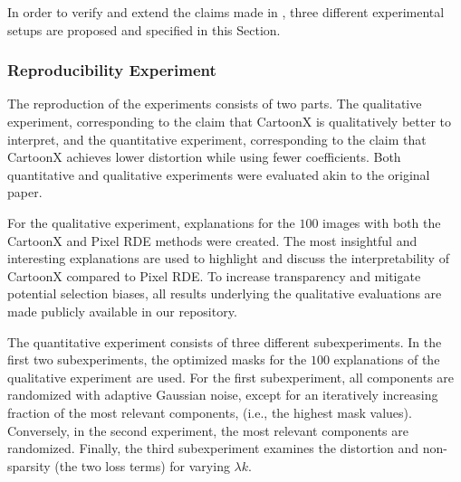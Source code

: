 In order to verify and extend the claims made in \cite{cartoonX}, three different experimental setups are proposed and specified in this Section.  


\subsubsection{Reproducibility Experiment}\label{exp1}

The reproduction of the experiments consists of two parts. The qualitative experiment, corresponding to the claim that CartoonX is qualitatively better to interpret, and the quantitative experiment, corresponding to the claim that CartoonX achieves lower distortion while using fewer coefficients.
Both quantitative and qualitative experiments were evaluated akin to the original paper.%

For the qualitative experiment, explanations for the $100$ images with both the CartoonX and Pixel RDE methods were created. The most insightful and interesting explanations are used to highlight and discuss the interpretability of CartoonX compared to Pixel RDE. To increase transparency and mitigate potential selection biases, all results underlying the qualitative evaluations are made publicly available in our repository. 

The quantitative experiment consists of three different subexperiments.
In the first two subexperiments, the optimized masks for the $100$ explanations of the qualitative experiment are used.
For the first subexperiment, all components are randomized with adaptive Gaussian noise, except for an iteratively increasing fraction of the most relevant components, (i.e., the highest mask values).
Conversely, in the second experiment, the most relevant components are randomized. Finally, the third subexperiment examines the distortion and non-sparsity (the two loss terms) for varying $\lambda k$.

